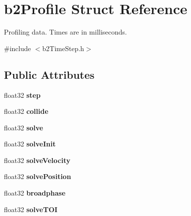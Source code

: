 \hypertarget{structb2_profile}{\section{b2\-Profile Struct Reference}
\label{structb2_profile}
}


Profiling data. Times are in milliseconds.  




{\ttfamily \#include $<$b2\-Time\-Step.\-h$>$}

\subsection*{Public Attributes}
\begin{DoxyCompactItemize}
\item 
\hypertarget{structb2_profile_a5b93de1d56902224868beacc478b9863}{float32 {\bfseries step}}\label{structb2_profile_a5b93de1d56902224868beacc478b9863}

\item 
\hypertarget{structb2_profile_af827d9e54f7a4e94d0a023e18466b960}{float32 {\bfseries collide}}\label{structb2_profile_af827d9e54f7a4e94d0a023e18466b960}

\item 
\hypertarget{structb2_profile_afbefc05f05ec8bfd6cb2011929688a0b}{float32 {\bfseries solve}}\label{structb2_profile_afbefc05f05ec8bfd6cb2011929688a0b}

\item 
\hypertarget{structb2_profile_a010110900c27ccc88cd5e23b0e12e96e}{float32 {\bfseries solve\-Init}}\label{structb2_profile_a010110900c27ccc88cd5e23b0e12e96e}

\item 
\hypertarget{structb2_profile_ae4d29a19b38de81621bccdbf75595233}{float32 {\bfseries solve\-Velocity}}\label{structb2_profile_ae4d29a19b38de81621bccdbf75595233}

\item 
\hypertarget{structb2_profile_a78e22d104226863492ebab9ea30a9ed9}{float32 {\bfseries solve\-Position}}\label{structb2_profile_a78e22d104226863492ebab9ea30a9ed9}

\item 
\hypertarget{structb2_profile_a6bd556e43a6fa3853adad9fd71e56b44}{float32 {\bfseries broadphase}}\label{structb2_profile_a6bd556e43a6fa3853adad9fd71e56b44}

\item 
\hypertarget{structb2_profile_a74e8ea0c6ca39250d639ec94b69a803e}{float32 {\bfseries solve\-T\-O\-I}}\label{structb2_profile_a74e8ea0c6ca39250d639ec94b69a803e}

\end{DoxyCompactItemize}


